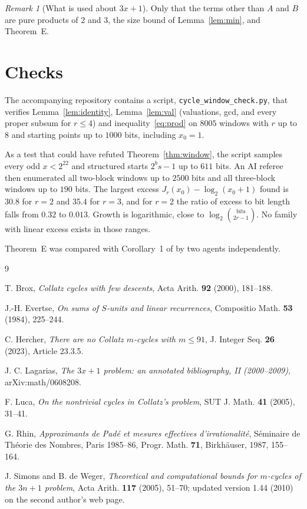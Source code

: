 \documentclass[11pt]{amsart}
\theoremstyle{remark}
\newtheorem{remark}{Remark}
\begin{document}
\begin{remark}[What is used about $3x+1$]
Only that the terms other than $A$ and $B$ are pure products of $2$ and $3$, the size bound
of Lemma~\ref{lem:min}, and Theorem~E.
\end{remark}

\section{Checks}

The accompanying repository contains a script, \texttt{cycle\_window\_check.py}, that
verifies Lemma~\ref{lem:identity}, Lemma~\ref{lem:val} (valuations, gcd, and every proper
subsum for $r\le 4$) and inequality~\eqref{eq:prod} on $8005$ windows with $r$ up to $8$ and
starting points up to $1000$ bits, including $x_0=1$.

As a test that could have refuted Theorem~\ref{thm:window}, the script samples every odd
$x<2^{22}$ and structured starts $2^bs-1$ up to $611$ bits. An AI referee then enumerated
all two-block windows up to $2500$ bits and all three-block windows up to $190$ bits. The
largest excess $J_r(x_0)-\log_2(x_0+1)$ found is $30.8$ for $r=2$ and $35.4$ for $r=3$, and
for $r=2$ the ratio of excess to bit length falls from $0.32$ to $0.013$. Growth is
logarithmic, close to $\log_2\binom{\text{bits}}{2r-1}$. No family with linear excess exists
in those ranges.

Theorem~E was compared with Corollary~1 of \cite{Evertse} by two agents independently.

\begin{thebibliography}{9}

 T. Brox, \emph{Collatz cycles with few descents}, Acta Arith. \textbf{92}
(2000), 181--188.

 J.-H. Evertse, \emph{On sums of $S$-units and linear recurrences},
Compositio Math. \textbf{53} (1984), 225--244.

 C. Hercher, \emph{There are no Collatz $m$-cycles with $m\le 91$},
J. Integer Seq. \textbf{26} (2023), Article 23.3.5.

 J. C. Lagarias, \emph{The $3x+1$ problem: an annotated bibliography, II
(2000--2009)}, arXiv:math/0608208.

 F. Luca, \emph{On the nontrivial cycles in Collatz's problem}, SUT J. Math.
\textbf{41} (2005), 31--41.

 G. Rhin, \emph{Approximants de Pad\'e et mesures effectives
d'irrationalit\'e}, S\'eminaire de Th\'eorie des Nombres, Paris 1985--86, Progr. Math.
\textbf{71}, Birkh\"auser, 1987, 155--164.

 J. Simons and B. de Weger, \emph{Theoretical and computational bounds for
$m$-cycles of the $3n+1$ problem}, Acta Arith. \textbf{117} (2005), 51--70; updated version
1.44 (2010) on the second author's web page.

\end{thebibliography}
\end{document}
